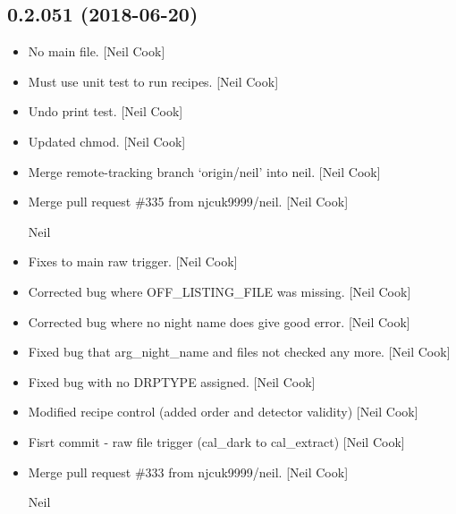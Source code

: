\documentclass[a4paper,10pt,english]{report}
\begin{document}
\subsection{0.2.051 (2018-06-20)}
\label{\detokenize{misc/changelog:id413}}\begin{itemize}
\item {} 
No main file. {[}Neil Cook{]}

\item {} 
Must use unit test to run recipes. {[}Neil Cook{]}

\item {} 
Undo print test. {[}Neil Cook{]}

\item {} 
Updated chmod. {[}Neil Cook{]}

\item {} 
Merge remote-tracking branch ‘origin/neil’ into neil. {[}Neil Cook{]}

\item {} 
Merge pull request \#335 from njcuk9999/neil. {[}Neil Cook{]}

Neil

\item {} 
Fixes to main raw trigger. {[}Neil Cook{]}

\item {} 
Corrected bug where OFF\_LISTING\_FILE was missing. {[}Neil Cook{]}

\item {} 
Corrected bug where no night name does give good error. {[}Neil Cook{]}

\item {} 
Fixed bug that arg\_night\_name and files not checked any more. {[}Neil
Cook{]}

\item {} 
Fixed bug with no DRPTYPE assigned. {[}Neil Cook{]}

\item {} 
Modified recipe control (added order and detector validity) {[}Neil
Cook{]}

\item {} 
Fisrt commit - raw file trigger (cal\_dark to cal\_extract) {[}Neil Cook{]}

\item {} 
Merge pull request \#333 from njcuk9999/neil. {[}Neil Cook{]}

Neil

\end{itemize}
\end{document}

